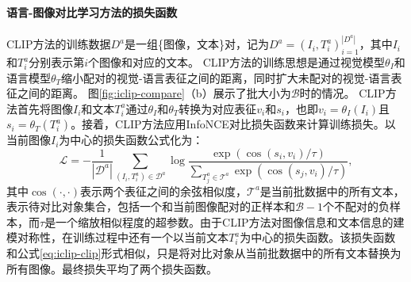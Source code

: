 \paragraph{语言-图像对比学习方法的损失函数} CLIP方法的训练数据$D^{a}$是一组\{图像，文本\}对，记为$D^{a}={(I_{i}, T_{i}^{a})}_{i=1}^{|D^{a}|}$，其中$I_{i}$和$T^{a}_{i}$分别表示第$i$个图像和对应的文本。
CLIP方法的训练思想是通过视觉模型$\theta_{I}$和语言模型$\theta_{T}$缩小配对的视觉-语言表征之间的距离，同时扩大未配对的视觉-语言表征之间的距离。
图\ref{fig:iclip-compare}（b）展示了批大小为$\mathcal{B}$时的情况。
CLIP方法首先将图像$I_{i}$和文本$T_{i}^{a}$通过$\theta_{I}$和$\theta_{T}$转换为对应表征$v_{i}$和$s_{i}$，也即$v_{i}=\theta_{I}(I_{i})$且$s_{i}=\theta_{T}(T_{i}^{a})$。接着，CLIP方法应用InfoNCE对比损失函数\cite{oord2018representation}来计算训练损失。以当前图像$I_{i}$为中心的损失函数公式化为：
\begin{equation}
 \mathcal{L}=-\frac{1}{\left|\mathcal{D}^{a}\right|} \sum_{\left(I_{i}, T_{i}^{a}\right) \in \mathcal{D}^{a}} \log \frac{\exp \left(\cos \left(s_{i}, v_{i}\right) / \tau\right)}{\sum_{T_{j}^{a} \in \mathcal{T}^{a}} \exp \left(\cos \left(s_{j}, v_{i}\right) / \tau\right)},
 \label{eq:iclip-clip}
\end{equation}
其中$\cos(\cdot, \cdot)$表示两个表征之间的余弦相似度，$\mathcal{T}^{a}$是当前批数据中的所有文本，表示待对比对象集合，包括一个和当前图像配对的正样本和$\mathcal{B}-1$个不配对的负样本，而$\tau$是一个缩放相似程度的超参数。由于CLIP方法对图像信息和文本信息的建模对称性，在训练过程中还有一个以当前文本$T_{i}^{a}$为中心的损失函数。该损失函数和公式\eqref{eq:iclip-clip}形式相似，只是将对比对象从当前批数据中的所有文本替换为所有图像。最终损失平均了两个损失函数。
 
